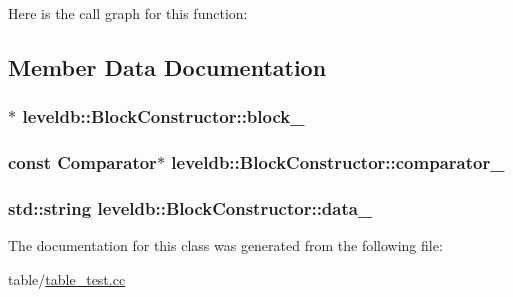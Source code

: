 Here is the call graph for this function\-:




\subsection{Member Data Documentation}
\hypertarget{classleveldb_1_1_block_constructor_a1ad4f51fb9369b137462a6693b6a69ae}{
\subsubsection[{block\-\_\-}]{$\ast$ leveldb\-::\-Block\-Constructor\-::block\-\_\-\hspace{0.3cm}{\ttfamily [private]}}}\label{classleveldb_1_1_block_constructor_a1ad4f51fb9369b137462a6693b6a69ae}
\hypertarget{classleveldb_1_1_block_constructor_a8032f2282569a0e187c2b05e4020c348}{
\subsubsection[{comparator\-\_\-}]{\setlength{\rightskip}{0pt plus 5cm}const {\bf Comparator}$\ast$ leveldb\-::\-Block\-Constructor\-::comparator\-\_\-\hspace{0.3cm}{\ttfamily [private]}}}\label{classleveldb_1_1_block_constructor_a8032f2282569a0e187c2b05e4020c348}
\hypertarget{classleveldb_1_1_block_constructor_a16288721d4801a1211ae00295866a142}{
\subsubsection[{data\-\_\-}]{\setlength{\rightskip}{0pt plus 5cm}std\-::string leveldb\-::\-Block\-Constructor\-::data\-\_\-\hspace{0.3cm}{\ttfamily [private]}}}\label{classleveldb_1_1_block_constructor_a16288721d4801a1211ae00295866a142}


The documentation for this class was generated from the following file\-:\begin{DoxyCompactItemize}
\item 
table/\hyperlink{table__test_8cc}{table\-\_\-test.\-cc}\end{DoxyCompactItemize}
